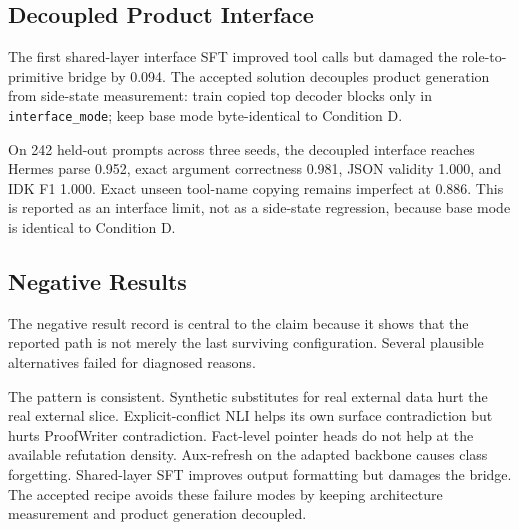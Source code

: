 \subsection{Decoupled Product Interface}

The first shared-layer interface SFT improved tool calls but damaged the
role-to-primitive bridge by 0.094. The accepted solution decouples product
generation from side-state measurement: train copied top decoder blocks only in
\texttt{interface\_mode}; keep base mode byte-identical to Condition D.




On 242 held-out prompts across three seeds, the decoupled interface reaches
Hermes parse 0.952, exact argument correctness 0.981, JSON validity 1.000, and
IDK F1 1.000. Exact unseen tool-name copying remains imperfect at 0.886. This is
reported as an interface limit, not as a side-state regression, because base
mode is identical to Condition D.

\subsection{Negative Results}

The negative result record is central to the claim because it shows that the
reported path is not merely the last surviving configuration. Several plausible
alternatives failed for diagnosed reasons.




The pattern is consistent. Synthetic substitutes for real external data hurt
the real external slice. Explicit-conflict NLI helps its own surface
contradiction but hurts ProofWriter contradiction. Fact-level pointer heads do
not help at the available refutation density. Aux-refresh on the adapted
backbone causes class forgetting. Shared-layer SFT improves output formatting
but damages the bridge. The accepted recipe avoids these failure modes by
keeping architecture measurement and product generation decoupled.
